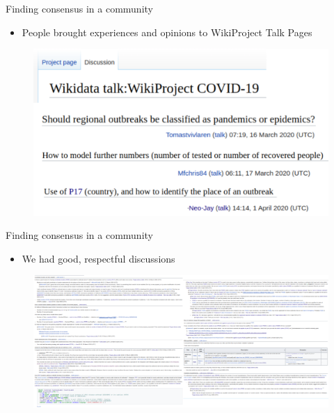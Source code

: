 \documentclass{beamer}
\begin{document}
\begin{frame}{Finding consensus in a community}
\begin{itemize}
    \item People brought experiences and opinions to WikiProject Talk Pages
\end{itemize}

\begin{figure}
\includegraphics[scale=0.65]{fig/discussion_headers.png}
\end{figure}

\end{frame}


\begin{frame}{Finding consensus in a community}
\begin{itemize}
    \item We had good, respectful discussions 
\end{itemize}

\begin{figure}
\includegraphics[scale=0.65]{fig/discussions_text.png}
\end{figure}

\end{frame}
\end{document}
